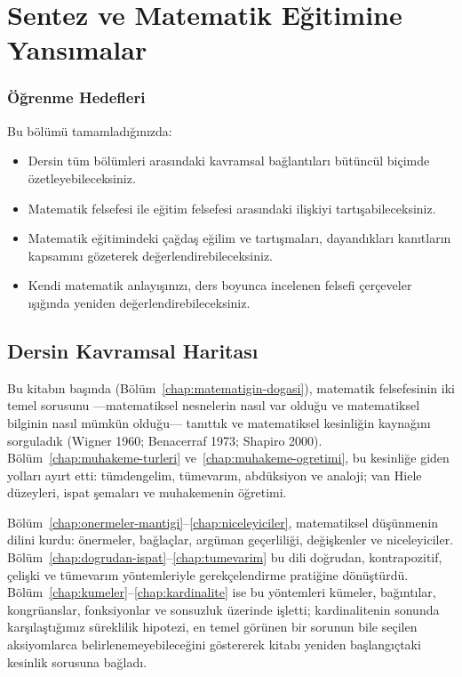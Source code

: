 \chapter{Sentez ve Matematik Eğitimine Yansımalar}
\label{chap:sentez}


\subsection*{Öğrenme Hedefleri}

Bu bölümü tamamladığınızda:

\begin{itemize}\setlength{\itemsep}{2pt}\setlength{\parskip}{0pt}
\item Dersin tüm bölümleri arasındaki kavramsal bağlantıları bütüncül biçimde özetleyebileceksiniz.
\item Matematik felsefesi ile eğitim felsefesi arasındaki ilişkiyi tartışabileceksiniz.
\item Matematik eğitimindeki çağdaş eğilim ve tartışmaları, dayandıkları kanıtların kapsamını gözeterek değerlendirebileceksiniz.
\item Kendi matematik anlayışınızı, ders boyunca incelenen felsefi çerçeveler ışığında yeniden değerlendirebileceksiniz.
\end{itemize}

\section{Dersin Kavramsal Haritası}

Bu kitabın başında (Bölüm~\ref{chap:matematigin-dogasi}), matematik felsefesinin iki temel sorusunu —matematiksel nesnelerin nasıl var olduğu ve matematiksel bilginin nasıl mümkün olduğu— tanıttık ve matematiksel kesinliğin kaynağını sorguladık (Wigner 1960; Benacerraf 1973; Shapiro 2000). Bölüm~\ref{chap:muhakeme-turleri} ve~\ref{chap:muhakeme-ogretimi}, bu kesinliğe giden yolları ayırt etti: tümdengelim, tümevarım, abdüksiyon ve analoji; van Hiele düzeyleri, ispat şemaları ve muhakemenin öğretimi.

Bölüm~\ref{chap:onermeler-mantigi}--\ref{chap:niceleyiciler}, matematiksel düşünmenin dilini kurdu: önermeler, bağlaçlar, argüman geçerliliği, değişkenler ve niceleyiciler. Bölüm~\ref{chap:dogrudan-ispat}--\ref{chap:tumevarim} bu dili doğrudan, kontrapozitif, çelişki ve tümevarım yöntemleriyle gerekçelendirme pratiğine dönüştürdü. Bölüm~\ref{chap:kumeler}--\ref{chap:kardinalite} ise bu yöntemleri kümeler, bağıntılar, kongrüanslar, fonksiyonlar ve sonsuzluk üzerinde işletti; kardinalitenin sonunda karşılaştığımız süreklilik hipotezi, en temel görünen bir sorunun bile seçilen aksiyomlarca belirlenemeyebileceğini göstererek kitabı yeniden başlangıçtaki kesinlik sorusuna bağladı.

